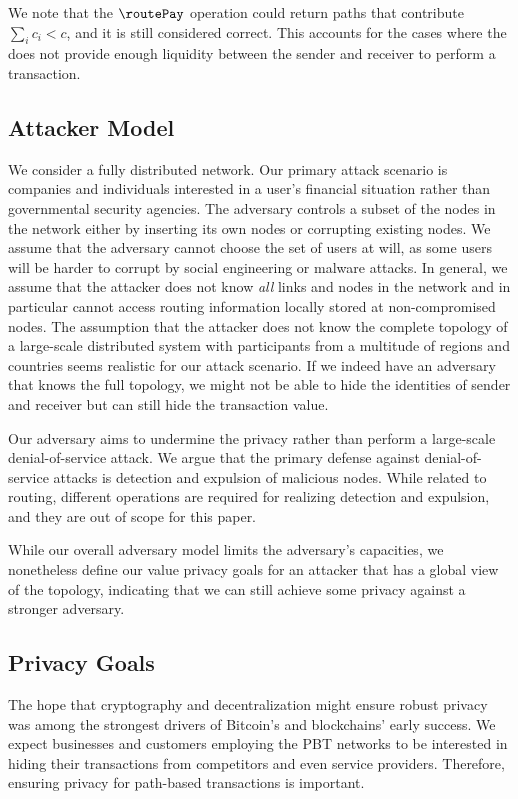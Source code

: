 We note that the $\routePay$ operation could return paths that contribute 
$\sum_i c_i < c$, and it is still considered correct. This accounts for the cases 
where the \paysys does not provide enough liquidity between the 
sender and receiver to perform a transaction. 

\subsection{Attacker Model}
\label{sec:attacker-model}

We consider a fully distributed network.
Our primary attack scenario is companies and individuals interested in a user's
financial situation rather than governmental security agencies.
 The adversary controls a subset of the nodes in the network
either by inserting its own nodes or corrupting existing nodes. 
We assume that the adversary cannot choose the set of users at will, as some users will
be harder to corrupt by social engineering or malware attacks.  
In general, we assume that the attacker does not know \emph{all} links and nodes in the network and
in particular cannot access routing information locally stored at non-compromised nodes. 
The assumption that the attacker does not know the complete topology of a large-scale distributed
system with participants from a multitude of regions and countries seems realistic for our attack
scenario. If we indeed have an adversary that knows the full topology, we might not be able to hide
the identities of sender and receiver but can still hide the transaction value. 
 
Our adversary aims to undermine the privacy rather than perform a large-scale denial-of-service attack.
We argue that the primary defense against denial-of-service attacks is detection and expulsion of
malicious nodes. While related to routing, different operations are required
for realizing detection and expulsion, and they are out of scope for this paper. 

 While our overall adversary model limits the adversary's capacities, 
 we nonetheless define our value privacy goals for an attacker that has a global view of the topology, 
 indicating that we can still achieve some privacy against a stronger adversary. 

\subsection{Privacy Goals}
\label{sec:privacy-goals}
The hope that cryptography and decentralization might ensure robust privacy 
was among the strongest drivers of Bitcoin's and blockchains' early success. 
We expect businesses and customers employing the PBT networks to be interested 
in hiding their transactions from competitors and even service providers. 
Therefore, ensuring privacy for path-based transactions is important.

